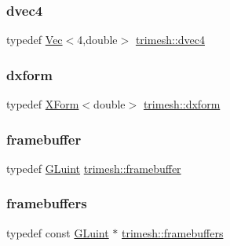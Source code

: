 \subsubsection{\texorpdfstring{dvec4}{dvec4}}
{\footnotesize\ttfamily typedef \hyperlink{classtrimesh_1_1Vec}{Vec}$<$4,double$>$ \hyperlink{namespacetrimesh_a5a6ab9e9336d86643e52af143b283c60}{trimesh\+::dvec4}}

\mbox{\label{namespacetrimesh_ada17437d42f05ec2e98e3f1286f16fbb}} 
\subsubsection{\texorpdfstring{dxform}{dxform}}
{\footnotesize\ttfamily typedef \hyperlink{classtrimesh_1_1XForm}{X\+Form}$<$double$>$ \hyperlink{namespacetrimesh_ada17437d42f05ec2e98e3f1286f16fbb}{trimesh\+::dxform}}

\mbox{\label{namespacetrimesh_a513a525ef9943f1b0914fdee627c0cfb}} 
\subsubsection{\texorpdfstring{framebuffer}{framebuffer}}
{\footnotesize\ttfamily typedef \hyperlink{namespacetrimesh_ad2289423ef47b393854afc30451d433b}{G\+Luint} \hyperlink{namespacetrimesh_a513a525ef9943f1b0914fdee627c0cfb}{trimesh\+::framebuffer}}

\mbox{\label{namespacetrimesh_ade07442e8ed85d3bc7a6c427e6b636b6}} 
\subsubsection{\texorpdfstring{framebuffers}{framebuffers}}
{\footnotesize\ttfamily typedef const \hyperlink{namespacetrimesh_ad2289423ef47b393854afc30451d433b}{G\+Luint} $\ast$ \hyperlink{namespacetrimesh_ade07442e8ed85d3bc7a6c427e6b636b6}{trimesh\+::framebuffers}}

\mbox{\label{namespacetrimesh_a6dc08ea49881bb2975b7d34e0c07faad}} 
